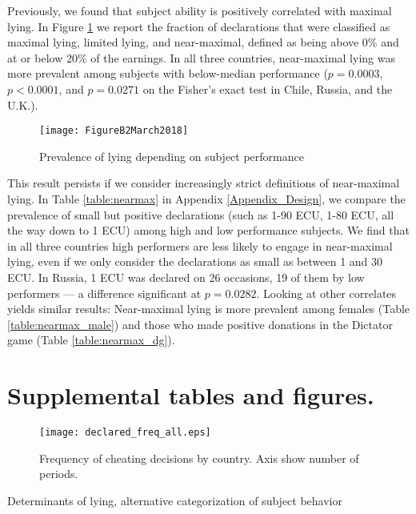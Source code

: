\documentclass[12pt]{article}
\begin{document}
\par Previously, we found that subject ability is positively correlated with maximal lying. In Figure \ref{fig:cheat_hilo} we report the fraction of declarations that were classified as maximal lying, limited lying, and near-maximal, defined as being above 0\% and at or below 20\% of the earnings. In all three countries, near-maximal lying was more prevalent among subjects with below-median performance ($p=0.0003$, $p<0.0001$, and $p=0.0271$ on the Fisher's exact test in Chile, Russia, and the U.K.).
\label{stata:nearmaxfig}

\begin{figure}[!htb]
\centerline{\texttt{[image: FigureB2March2018]}}
\caption{Prevalence of lying depending on subject performance}\label{fig:cheat_hilo}
\end{figure}

This result persists if we consider increasingly strict definitions of near-maximal lying. In Table \ref{table:nearmax} in Appendix \ref{Appendix_Design}, we compare the prevalence of small but positive declarations (such as 1-90 ECU, 1-80 ECU, all the way down to 1 ECU) among high and low performance subjects. We find that in all three countries high performers are less likely to engage in near-maximal lying, even if we only consider the declarations as small as between 1 and 30 ECU. In Russia, 1 ECU was declared on 26 occasions, 19 of them by low performers --- a difference significant at $p=0.0282$. Looking at other correlates yields similar results: Near-maximal lying is more prevalent among females (Table \ref{table:nearmax_male}) and those who made positive donations in the Dictator game (Table \ref{table:nearmax_dg}).  


\clearpage



\section{Supplemental tables and figures.}
\label{AppendixA}

\setcounter{table}{0}
\setcounter{figure}{0}

\begin{figure}[!htb]
\centerline{\texttt{[image: declared\_freq\_all.eps]}}
\caption{Frequency of cheating decisions by country. Axis show number of periods.}\label{fig:declared_freq_all}
\end{figure}

\begin{table}[ht]
\begin{center}
\tiny

\end{center}
\caption{Determinants of lying, alternative categorization of subject behavior}
\label{table1_1}
\end{table}
\end{document}
